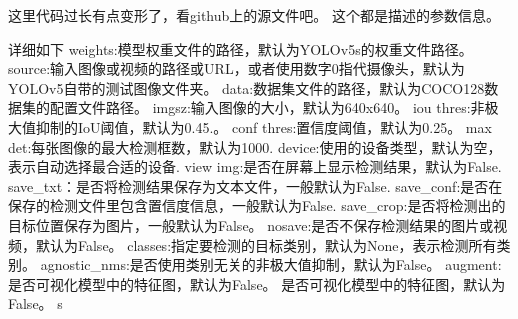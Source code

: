 这里代码过长有点变形了，看github上的源文件吧。
这个都是描述的参数信息。

详细如下
weights:模型权重文件的路径，默认为YOLOv5s的权重文件路径。
source:输入图像或视频的路径或URL，或者使用数字0指代摄像头，默认为YOLOv5自带的测试图像文件夹。
data:数据集文件的路径，默认为COCO128数据集的配置文件路径。
imgsz:输入图像的大小，默认为640x640。
iou thres:非极大值抑制的IoU阈值，默认为0.45.。
conf thres:置信度阈值，默认为0.25。
max det:每张图像的最大检测框数，默认为1000.
device:使用的设备类型，默认为空，表示自动选择最合适的设备.
view img:是否在屏幕上显示检测结果，默认为False.
save_txt：是否将检测结果保存为文本文件，一般默认为False.
save_conf:是否在保存的检测文件里包含置信度信息，一般默认为False.
save_crop:是否将检测出的目标位置保存为图片，一般默认为False。
nosave:是否不保存检测结果的图片或视频，默认为False。
classes:指定要检测的目标类别，默认为None，表示检测所有类别。
agnostic_nms:是否使用类别无关的非极大值抑制，默认为False。
augment:是否可视化模型中的特征图，默认为False。
是否可视化模型中的特征图，默认为False。
s